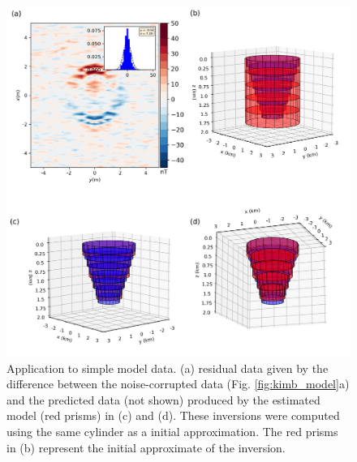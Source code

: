 \begin{figure}
	\centering
	\includegraphics[scale=.5]{figures/wedding_cake_results.png}
	\caption{Application to simple model data. (a) residual data given by the difference between the noise-corrupted data (Fig. \ref{fig:kimb_model}a) and the predicted data (not shown) produced by the estimated model (red prisms) in (c) and (d). These inversions were computed using the same cylinder as a initial approximation. The red prisms in (b) represent the initial approximate of the inversion.
	}
	\label{fig:kimb_results}
\end{figure}

